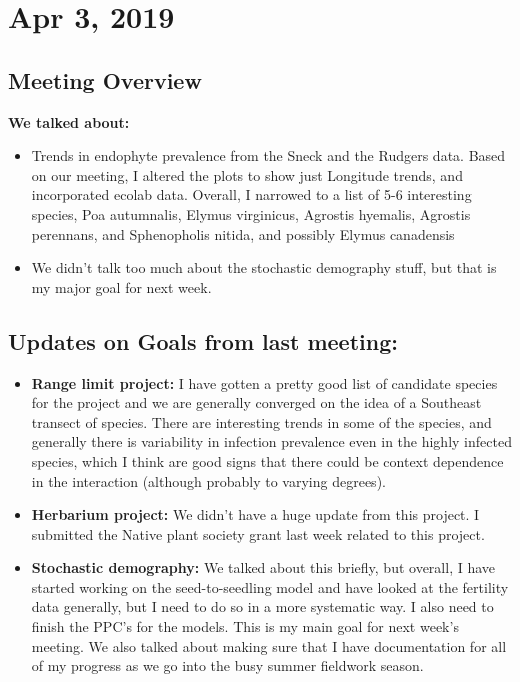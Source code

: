 \documentclass{article}
\begin{document}
\section*{Apr 3, 2019}
\subsection*{Meeting Overview}
\textbf{We talked about:}
\begin{itemize}
\item{Trends in endophyte prevalence from the Sneck and the Rudgers data. Based on our meeting, I altered the plots to show just Longitude trends, and incorporated ecolab data. Overall, I narrowed to a list of 5-6 interesting species, Poa autumnalis, Elymus virginicus, Agrostis hyemalis, Agrostis perennans, and Sphenopholis nitida, and possibly Elymus canadensis}
\item{We didn't talk too much about the stochastic demography stuff, but that is my major goal for next week.}
\end{itemize}

\subsection*{Updates on Goals from last meeting:}
\begin{itemize}
\item{\textbf{Range limit project:} I have gotten a pretty good list of candidate species for the project and we are generally converged on the idea of a Southeast transect of species. There are interesting trends in some of the species, and generally there is variability in infection prevalence even in the highly infected species, which I think are good signs that there could be context dependence in the interaction (although probably to varying degrees).}
\item{\textbf{Herbarium project:} We didn't have a huge update from this project. I submitted the Native plant society grant last week related to this project.}
\item{\textbf{Stochastic demography:} We talked about this briefly, but overall, I have started working on the seed-to-seedling model and have looked at the fertility data generally, but I need to do so in a more systematic way. I also need to finish the PPC's for the models. This is my main goal for next week's meeting. We also talked about making sure that I have documentation for all of my progress as we go into the busy summer fieldwork season.}
\end{itemize}
\end{document}
